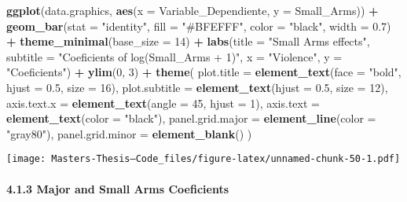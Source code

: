 \documentclass[
  11pt,
]{article}
\newenvironment{Shaded}{\begin{snugshade}}{\end{snugshade}}
\newcommand{\AttributeTok}[1]{\textcolor[rgb]{0.13,0.29,0.53}{#1}}
\newcommand{\DecValTok}[1]{\textcolor[rgb]{0.00,0.00,0.81}{#1}}
\newcommand{\FloatTok}[1]{\textcolor[rgb]{0.00,0.00,0.81}{#1}}
\newcommand{\FunctionTok}[1]{\textcolor[rgb]{0.13,0.29,0.53}{\textbf{#1}}}
\newcommand{\NormalTok}[1]{#1}
\newcommand{\SpecialCharTok}[1]{\textcolor[rgb]{0.81,0.36,0.00}{\textbf{#1}}}
\newcommand{\StringTok}[1]{\textcolor[rgb]{0.31,0.60,0.02}{#1}}
\begin{document}
\begin{Shaded}
\begin{Highlighting}[]
\FunctionTok{ggplot}\NormalTok{(data.graphics, }\FunctionTok{aes}\NormalTok{(}\AttributeTok{x =}\NormalTok{ Variable\_Dependiente, }\AttributeTok{y =}\NormalTok{ Small\_Arms)) }\SpecialCharTok{+}
  \FunctionTok{geom\_bar}\NormalTok{(}\AttributeTok{stat =} \StringTok{"identity"}\NormalTok{, }\AttributeTok{fill =} \StringTok{"\#BFEFFF"}\NormalTok{, }\AttributeTok{color =} \StringTok{"black"}\NormalTok{, }\AttributeTok{width =} \FloatTok{0.7}\NormalTok{) }\SpecialCharTok{+}
  \FunctionTok{theme\_minimal}\NormalTok{(}\AttributeTok{base\_size =} \DecValTok{14}\NormalTok{) }\SpecialCharTok{+}
  \FunctionTok{labs}\NormalTok{(}\AttributeTok{title =} \StringTok{"Small Arms effects"}\NormalTok{,}
       \AttributeTok{subtitle =} \StringTok{"Coeficients of log(Small\_Arms + 1)"}\NormalTok{,}
       \AttributeTok{x =} \StringTok{"Violence"}\NormalTok{,}
       \AttributeTok{y =} \StringTok{"Coeficients"}\NormalTok{) }\SpecialCharTok{+}
  \FunctionTok{ylim}\NormalTok{(}\DecValTok{0}\NormalTok{, }\DecValTok{3}\NormalTok{) }\SpecialCharTok{+}
  \FunctionTok{theme}\NormalTok{(}
    \AttributeTok{plot.title =} \FunctionTok{element\_text}\NormalTok{(}\AttributeTok{face =} \StringTok{"bold"}\NormalTok{, }\AttributeTok{hjust =} \FloatTok{0.5}\NormalTok{, }\AttributeTok{size =} \DecValTok{16}\NormalTok{),}
    \AttributeTok{plot.subtitle =} \FunctionTok{element\_text}\NormalTok{(}\AttributeTok{hjust =} \FloatTok{0.5}\NormalTok{, }\AttributeTok{size =} \DecValTok{12}\NormalTok{),}
    \AttributeTok{axis.text.x =} \FunctionTok{element\_text}\NormalTok{(}\AttributeTok{angle =} \DecValTok{45}\NormalTok{, }\AttributeTok{hjust =} \DecValTok{1}\NormalTok{),}
    \AttributeTok{axis.text =} \FunctionTok{element\_text}\NormalTok{(}\AttributeTok{color =} \StringTok{"black"}\NormalTok{),}
    \AttributeTok{panel.grid.major =} \FunctionTok{element\_line}\NormalTok{(}\AttributeTok{color =} \StringTok{"gray80"}\NormalTok{),}
    \AttributeTok{panel.grid.minor =} \FunctionTok{element\_blank}\NormalTok{()}
\NormalTok{  )}
\end{Highlighting}
\end{Shaded}

\texttt{[image: Masters-Thesis--Code\_files/figure-latex/unnamed-chunk-50-1.pdf]}

\paragraph{4.1.3 Major and Small Arms
Coeficients}\label{major-and-small-arms-coeficients}
\end{document}
